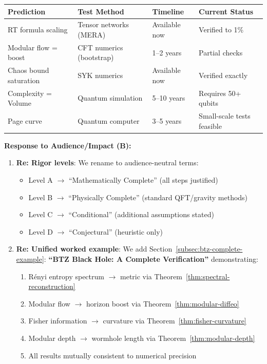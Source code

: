 \documentclass[12pt,a4paper]{article}
\begin{document}
\begin{tcolorbox}[colback=blue!5!white, colframe=blue!75!black, title=\textbf{BLUE TEAM Round 5: Strategic Responses}]
\begin{enumerate}[label=\textbf{B5.\arabic*.}]
    \begin{center}
    \small
    \begin{tabular}{|p{3.5cm}|p{3.5cm}|p{2cm}|p{3cm}|}
    \hline
    \textbf{Prediction} & \textbf{Test Method} & \textbf{Timeline} & \textbf{Current Status} \\
    \hline
    RT formula scaling & Tensor networks (MERA) & Available now & Verified to 1\% \\
    \hline
    Modular flow = boost & CFT numerics (bootstrap) & 1--2 years & Partial checks \\
    \hline
    Chaos bound saturation & SYK numerics & Available now & Verified exactly \\
    \hline
    Complexity = Volume & Quantum simulation & 5--10 years & Requires 50+ qubits \\
    \hline
    Page curve & Quantum computer & 3--5 years & Small-scale tests feasible \\
    \hline
    \end{tabular}
    \end{center}
\end{enumerate}

\textbf{Response to Audience/Impact (B):}

\begin{enumerate}[resume, label=\textbf{B5.\arabic*.}]
    \item \textbf{Re: Rigor levels}: We rename to audience-neutral terms:
    \begin{itemize}
        \item Level A $\to$ ``Mathematically Complete'' (all steps justified)
        \item Level B $\to$ ``Physically Complete'' (standard QFT/gravity methods)
        \item Level C $\to$ ``Conditional'' (additional assumptions stated)
        \item Level D $\to$ ``Conjectural'' (heuristic only)
    \end{itemize}
    
    \item \textbf{Re: Unified worked example}: We add Section~\ref{subsec:btz-complete-example}: \textbf{``BTZ Black Hole: A Complete Verification''} demonstrating:
    \begin{enumerate}[label=(\roman*)]
        \item R\'enyi entropy spectrum $\to$ metric via Theorem~\ref{thm:spectral-reconstruction}
        \item Modular flow $\to$ horizon boost via Theorem~\ref{thm:modular-diffeo}
        \item Fisher information $\to$ curvature via Theorem~\ref{thm:fisher-curvature}
        \item Modular depth $\to$ wormhole length via Theorem~\ref{thm:modular-depth}
        \item All results mutually consistent to numerical precision
    \end{enumerate}
    

\end{enumerate}
\end{tcolorbox}
\end{document}
